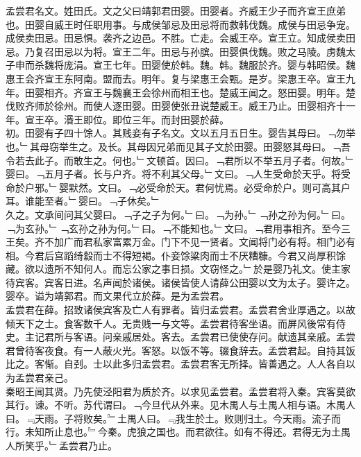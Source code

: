 \documentclass{zhvt-classic}
\begin{document}

\hspace*{2em}孟尝君名文。姓田氏。文之父曰靖郭君田婴。田婴者。齐威王少子而齐宣王庶弟也。田婴自威王时任职用事。与成侯邹忌及田忌将而救韩伐魏。成侯与田忌争宠。成侯卖田忌。田忌惧。袭齐之边邑。不胜。亡走。会威王卒。宣王立。知成侯卖田忌。乃复召田忌以为将。宣王二年。田忌与孙膑。田婴俱伐魏。败之马陵。虏魏太子申而杀魏将庞涓。宣王七年。田婴使於韩。魏。韩。魏服於齐。婴与韩昭侯。魏惠王会齐宣王东阿南。盟而去。明年。复与梁惠王会甄。是岁。梁惠王卒。宣王九年。田婴相齐。齐宣王与魏襄王会徐州而相王也。楚威王闻之。怒田婴。明年。楚伐败齐师於徐州。而使人逐田婴。田婴使张丑说楚威王。威王乃止。田婴相齐十一年。宣王卒。湣王即位。即位三年。而封田婴於薛。\\
\hspace*{2em}初。田婴有子四十馀人。其贱妾有子名文。文以五月五日生。婴告其母曰。﹁勿举也。﹂其母窃举生之。及长。其母因兄弟而见其子文於田婴。田婴怒其母曰。﹁吾令若去此子。而敢生之。何也。﹂文顿首。因曰。﹁君所以不举五月子者。何故。﹂婴曰。﹁五月子者。长与户齐。将不利其父母。﹂文曰。﹁人生受命於天乎。将受命於户邪。﹂婴默然。文曰。﹁必受命於天。君何忧焉。必受命於户。则可高其户耳。谁能至者。﹂婴曰。﹁子休矣。﹂\\
\hspace*{2em}久之。文承间问其父婴曰。﹁子之子为何。﹂曰。﹁为孙。﹂﹁孙之孙为何。﹂曰。﹁为玄孙。﹂﹁玄孙之孙为何。﹂曰。﹁不能知也。﹂文曰。﹁君用事相齐。至今三王矣。齐不加广而君私家富累万金。门下不见一贤者。文闻将门必有将。相门必有相。今君后宫蹈绮縠而士不得短褐。仆妾馀粱肉而士不厌糟糠。今君又尚厚积馀藏。欲以遗所不知何人。而忘公家之事日损。文窃怪之。﹂於是婴乃礼文。使主家待宾客。宾客日进。名声闻於诸侯。诸侯皆使人请薛公田婴以文为太子。婴许之。婴卒。谥为靖郭君。而文果代立於薛。是为孟尝君。\\
\hspace*{2em}孟尝君在薛。招致诸侯宾客及亡人有罪者。皆归孟尝君。孟尝君舍业厚遇之。以故倾天下之士。食客数千人。无贵贱一与文等。孟尝君待客坐语。而屏风後常有侍史。主记君所与客语。问亲戚居处。客去。孟尝君已使使存问。献遗其亲戚。孟尝君曾待客夜食。有一人蔽火光。客怒。以饭不等。辍食辞去。孟尝君起。自持其饭比之。客惭。自刭。士以此多归孟尝君。孟尝君客无所择。皆善遇之。人人各自以为孟尝君亲己。\\
\hspace*{2em}秦昭王闻其贤。乃先使泾阳君为质於齐。以求见孟尝君。孟尝君将入秦。宾客莫欲其行。谏。不听。苏代谓曰。﹁今旦代从外来。见木禺人与土禺人相与语。木禺人曰。﹃天雨。子将败矣。﹄土禺人曰。﹃我生於土。败则归土。今天雨。流子而行。未知所止息也。﹄今秦。虎狼之国也。而君欲往。如有不得还。君得无为土禺人所笑乎。﹂孟尝君乃止。\\
\end{document}
